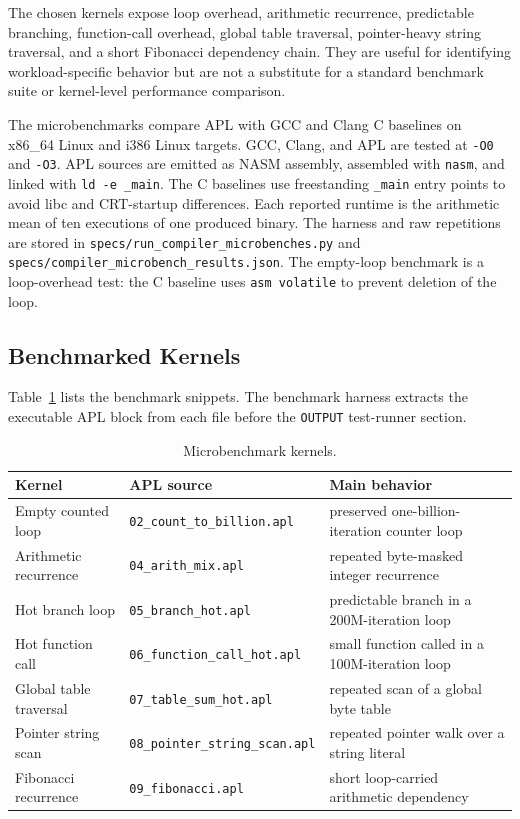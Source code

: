 \documentclass[10pt,twocolumn]{article}
\begin{document}
\par The chosen kernels expose loop overhead, arithmetic recurrence, predictable branching, function-call overhead, global table traversal, pointer-heavy string traversal, and a short Fibonacci dependency chain. They are useful for identifying workload-specific behavior but are not a substitute for a standard benchmark suite or kernel-level performance comparison.

\par The microbenchmarks compare APL with GCC and Clang C baselines on x86\_64 Linux and i386 Linux targets. GCC, Clang, and APL are tested at \texttt{-O0} and \texttt{-O3}. APL sources are emitted as NASM assembly, assembled with \texttt{nasm}, and linked with \texttt{ld -e \_main}. The C baselines use freestanding \texttt{\_main} entry points to avoid libc and CRT-startup differences. Each reported runtime is the arithmetic mean of ten executions of one produced binary. The harness and raw repetitions are stored in \texttt{specs/run\_compiler\_microbenches.py} and \texttt{specs/compiler\_microbench\_results.json}. The empty-loop benchmark is a loop-overhead test: the C baseline uses \texttt{asm volatile} to prevent deletion of the loop.

\subsection{Benchmarked Kernels}

\par Table~\ref{tab:bench-kernels} lists the benchmark snippets. The benchmark harness extracts the executable APL block from each file before the \texttt{OUTPUT} test-runner section.

\begin{table}[t]
\centering
\caption{Microbenchmark kernels.}
\label{tab:bench-kernels}
\begin{tabular}{lll}
    \toprule
    Kernel & APL source & Main behavior \\
    \midrule
    Empty counted loop & \texttt{02\_count\_to\_billion.apl} & preserved one-billion-iteration counter loop \\
    Arithmetic recurrence & \texttt{04\_arith\_mix.apl} & repeated byte-masked integer recurrence \\
    Hot branch loop & \texttt{05\_branch\_hot.apl} & predictable branch in a 200M-iteration loop \\
    Hot function call & \texttt{06\_function\_call\_hot.apl} & small function called in a 100M-iteration loop \\
    Global table traversal & \texttt{07\_table\_sum\_hot.apl} & repeated scan of a global byte table \\
    Pointer string scan & \texttt{08\_pointer\_string\_scan.apl} & repeated pointer walk over a string literal \\
    Fibonacci recurrence & \texttt{09\_fibonacci.apl} & short loop-carried arithmetic dependency \\
    \bottomrule
\end{tabular}
\end{table}
\end{document}

